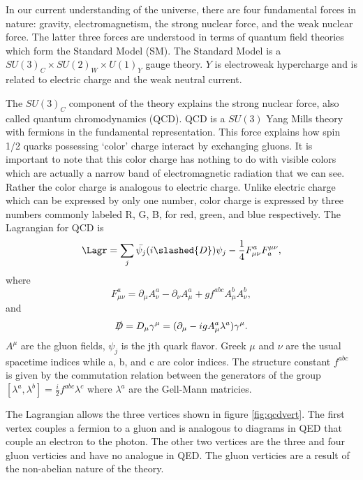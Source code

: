 
In our current understanding of the universe, there are four fundamental forces in nature: gravity, electromagnetism, the strong nuclear force, and the weak nuclear force.
The latter three forces are understood in terms of quantum field theories which form the Standard Model (SM).
The Standard Model is a $SU(3)_C\times SU(2)_W\times U(1)_Y$ gauge theory.
$Y$ is electroweak hypercharge and is related to electric charge and the weak neutral current.

The $SU(3)_C$ component of the theory explains the strong nuclear force, also called quantum chromodynamics (QCD).
QCD is a $SU(3)$ Yang Mills theory with fermions in the fundamental representation.
This force explains how spin 1/2 quarks possessing `color' charge interact by exchanging gluons.
It is important to note that this color charge has nothing to do with visible colors which are actually a narrow band of electromagnetic radiation that we can see.
Rather the color charge is analogous to electric charge.
Unlike electric charge which can be expressed by only one number, color charge is expressed by three numbers commonly labeled R, G, B, for red, green, and blue respectively.
The Lagrangian for QCD is
\begin{equation}
  \label{eq:qcd}
  \Lagr = \sum_j\bar{\psi_j}(i\slashed{D})\psi_j-\frac{1}{4}F^a_{\mu\nu}F^{\mu\nu}_a,
\end{equation}
where
\begin{equation}
  F^a_{\mu\nu}=\partial_\mu A^a_\nu-\partial_\nu A^a_\mu+gf^{abc}A^b_\mu A^b_\nu,
\end{equation}
and
\begin{equation}
  \slashed{D}=D_\mu\gamma^\mu=(\partial_\mu-igA^a_\mu\lambda^a)\gamma^\mu.
\end{equation}
$A^\mu$ are the gluon fields, $\psi_j$ is the jth quark flavor.
Greek $\mu$ and $\nu$ are the usual spacetime indices while a, b, and c are color indices.
The structure constant $f^{abc}$ is given by the commutation relation between the generators of the group $[\lambda^a,\lambda^b]=\frac{i}{2}f^{abc}\lambda^c$ where $\lambda^a$ are the Gell-Mann matricies.

The Lagrangian allows the three vertices shown in figure \ref{fig:qcdvert}.
The first vertex couples a fermion to a gluon and is analogous to diagrams in QED that couple an electron to the photon.
The other two vertices are the three and four gluon verticies and have no analogue in QED.
The gluon verticies are a result of the non-abelian nature of the theory.


